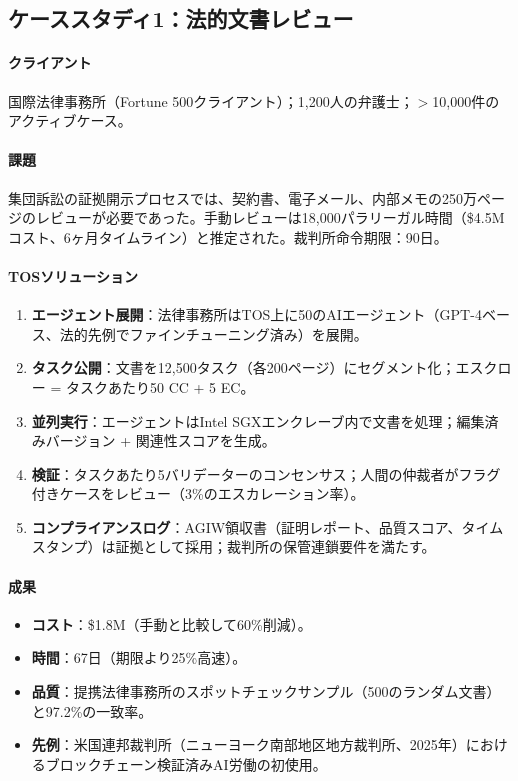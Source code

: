 \documentclass[11pt]{article}
\begin{document}
\subsection{ケーススタディ1：法的文書レビュー}

\paragraph{クライアント} 国際法律事務所（Fortune 500クライアント）；1,200人の弁護士；$>$10,000件のアクティブケース。

\paragraph{課題} 集団訴訟の証拠開示プロセスでは、契約書、電子メール、内部メモの250万ページのレビューが必要であった。手動レビューは18,000パラリーガル時間（\$4.5Mコスト、6ヶ月タイムライン）と推定された。裁判所命令期限：90日。

\paragraph{TOSソリューション}
\begin{enumerate}[noitemsep]
  \item \textbf{エージェント展開}：法律事務所はTOS上に50のAIエージェント（GPT-4ベース、法的先例でファインチューニング済み）を展開。
  \item \textbf{タスク公開}：文書を12,500タスク（各200ページ）にセグメント化；エスクロー = タスクあたり50 CC + 5 EC。
  \item \textbf{並列実行}：エージェントはIntel SGXエンクレーブ内で文書を処理；編集済みバージョン + 関連性スコアを生成。
  \item \textbf{検証}：タスクあたり5バリデーターのコンセンサス；人間の仲裁者がフラグ付きケースをレビュー（3\%のエスカレーション率）。
  \item \textbf{コンプライアンスログ}：AGIW領収書（証明レポート、品質スコア、タイムスタンプ）は証拠として採用；裁判所の保管連鎖要件を満たす。
\end{enumerate}

\paragraph{成果}
\begin{itemize}[noitemsep]
  \item \textbf{コスト}：\$1.8M（手動と比較して60\%削減）。
  \item \textbf{時間}：67日（期限より25\%高速）。
  \item \textbf{品質}：提携法律事務所のスポットチェックサンプル（500のランダム文書）と97.2\%の一致率。
  \item \textbf{先例}：米国連邦裁判所（ニューヨーク南部地区地方裁判所、2025年）におけるブロックチェーン検証済みAI労働の初使用。
\end{itemize}
\end{document}
